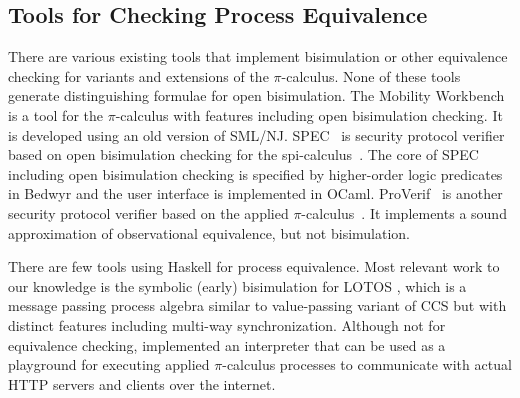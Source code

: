 \subsection{Tools for Checking Process Equivalence}
\label{sec:relwork:tools}
There are various existing tools that implement bisimulation or
other equivalence checking for variants and extensions of the $\pi$-calculus.
None of these tools generate distinguishing formulae for open bisimulation. 
The Mobility Workbench~\cite{VicMol94mwb} is a tool for the $\pi$-calculus
with features including open bisimulation checking.
It is developed using an old version of SML/NJ.
SPEC~\cite{TiuNamHor16spec} is security protocol verifier based on
open bisimulation checking \cite{TiuDaw10} for the spi-calculus~\cite{Abadi97ccs}.
The core of SPEC including open bisimulation checking is specified by
higher-order logic predicates in Bedwyr \cite{Bedwyr07} and the user interface
is implemented in OCaml.
ProVerif~\cite{BlaFou05} is another security protocol verifier based on
the applied $\pi$-calculus~\cite{AbaFou01appi}. It implements a sound
approximation of observational equivalence, but not bisimulation. 


There are few tools using Haskell for process equivalence.
Most relevant work to our knowledge is the symbolic (early) bisimulation for
LOTOS \cite{CalSha01lotos}, which is a message passing process algebra
similar to value-passing variant of CCS but with distinct features
including multi-way synchronization. Although not for equivalence checking,
\citet{Renzy14phi} implemented an interpreter that can be used as
a playground for executing applied $\pi$-calculus processes to
communicate with actual HTTP servers and clients over the internet.

